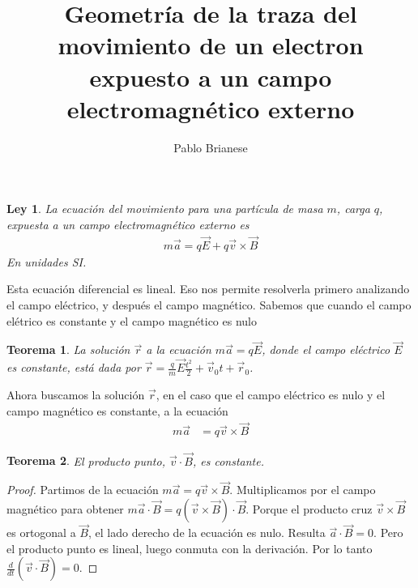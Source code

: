 \documentclass{article}
\title{Geometría de la traza del movimiento de un electron expuesto a un campo electromagnético externo}
\author{Pablo Brianese}
\newtheorem{physicalLaw}{Ley}
\newtheorem{theorem}{Teorema}
\begin{document}
  \maketitle
  \begin{physicalLaw}
    La ecuación del movimiento para una partícula de masa \(m\), carga \(q\), expuesta a un campo electromagnético externo es
    \begin{align}
      \label{equation:movementOfChargedParticleExposedToElectromagneticField}
      m \vec{a}
      =
      q \vec{E} + q \vec{v} \times \vec{B}
    \end{align}
    En unidades SI.
  \end{physicalLaw}

  Esta ecuación diferencial es lineal.
  Eso nos permite resolverla primero analizando el campo eléctrico, y después el campo magnético.
  Sabemos que cuando el campo elétrico es constante y el campo magnético es nulo
  \begin{theorem}
    La solución \(\vec{r}\) a la ecuación \(m \vec{a} = q \vec{E}\), donde el campo eléctrico \(\vec{E}\) es constante, está dada por \(\vec{r} = \frac{q}{m} \vec{E} \frac{t^2}{2} + \vec{v}_0 t + \vec{r}_0\).
  \end{theorem}

  Ahora buscamos la solución \(\vec{r}\), en el caso que el campo eléctrico es nulo y el campo magnético es constante, a la ecuación
  \begin{align}
    m \vec{a}
    &=
    q \vec{v} \times \vec{B}
  \end{align}

  \begin{theorem}
    \label{theorem:velocity_dot_magneticFieldIsConstant}
    El producto punto, \(\vec{v} \cdot \vec{B}\), es constante.
  \end{theorem}
  \begin{proof}
    Partimos de la ecuación \(m \vec{a} = q \vec{v} \times \vec{B}\).
    Multiplicamos por el campo magnético para obtener \(m \vec{a} \cdot \vec{B} = q (\vec{v} \times \vec{B}) \cdot \vec{B}\).
    Porque el producto cruz \(\vec{v} \times \vec{B}\) es ortogonal a \(\vec{B}\), el lado derecho de la ecuación es nulo.
    Resulta \(\vec{a} \cdot \vec{B} = 0\).
    Pero el producto punto es lineal, luego conmuta con la derivación.
    Por lo tanto \(\frac{d}{d t} (\vec{v} \cdot \vec{B}) = 0\).
  \end{proof}
\end{document}
